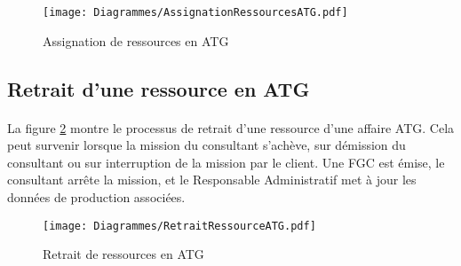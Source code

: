 \begin{figure}[H]
	\centering
\begin{sideways}
	\texttt{[image: Diagrammes/AssignationRessourcesATG.pdf]}
\end{sideways}
	\caption{Assignation de ressources en ATG} 
	\label{asgnRcesATG}
\end{figure}


\subsection{Retrait d'une ressource en ATG}
\paragraph{} La figure \ref{retraitATG} montre le processus de retrait d'une ressource d'une affaire ATG. Cela peut survenir lorsque la mission du consultant s'achève, sur démission du consultant ou sur interruption de la mission par le client. Une FGC est émise, le consultant arrête la mission, et le Responsable Administratif met à jour les données de production associées. 


\begin{figure}[H]
	\centering
	\texttt{[image: Diagrammes/RetraitRessourceATG.pdf]}
	\caption{Retrait de ressources en ATG} 
	\label{retraitATG}
\end{figure}




